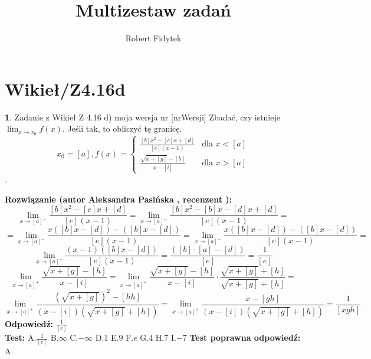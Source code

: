 \documentclass[12pt, a4paper]{article}
\title{Multizestaw zadań}
\author{Robert Fidytek}
\date{}
\theoremstyle{definition} %
\newtheorem{zad}{}
\newcommand{\kategoria}[1]{\section{#1}} %
\newcommand{\zadStart}[1]{\begin{zad}#1\newline} %
\newcommand{\zadStop}{\end{zad}}   %
\newcommand{\rozwStart}[2]{\noindent \textbf{Rozwiązanie (autor #1 , recenzent #2): }\newline} %
\newcommand{\rozwStop}{\newline}                                            %
\newcommand{\odpStart}{\noindent \textbf{Odpowiedź:}\newline}    %
\newcommand{\odpStop}{\newline}                                             %
\newcommand{\testStart}{\noindent \textbf{Test:}\newline} %
\newcommand{\testStop}{\newline} %
\newcommand{\kluczStart}{\noindent \textbf{Test poprawna odpowiedź:}\newline} %
\newcommand{\kluczStop}{\newline} %
\begin{document}
\maketitle


\kategoria{Wikieł/Z4.16d}
\zadStart{Zadanie z Wikieł Z 4.16 d) moja wersja nr [nrWersji]}
Zbadać, czy istnieje $\lim_{x\rightarrow x_{0}}f(x)$. Jeśli tak, to obliczyć tę granicę. $$x_{0}=[a],f(x)= \left\{ \begin{array}{ll}
\frac{[b]x^2-[c]x+[d]}{[e](x-1)}& \textrm{dla $x<[a]$}\\
\frac{\sqrt{x+[g]}-[h]}{x-[i]} & \textrm{dla $x>[a]$}
\end{array} \right.$$.
\zadStop
\rozwStart{Aleksandra Pasińska}{}
$$\lim_{x\rightarrow [a]^-}\frac{[b]x^2-[c]x+[d]}{[e](x-1)}=\lim_{x\rightarrow [a]^-}\frac{[b]x^2-[b]x-[d]x+[d]}{[e](x-1)}=$$
$$=\lim_{x\rightarrow [a]^-}\frac{x([b]x-[d])-([b]x-[d])}{[e](x-1)}=\lim_{x\rightarrow [a]^-}\frac{x([b]x-[d])-([b]x-[d])}{[e](x-1)}=$$
$$\lim_{x\rightarrow [a]^-}\frac{(x-1)([b]x-[d])}{[e](x-1)}=\frac{([b]\cdot [a]-[d])}{[e]}=\frac{1}{[e]}$$
$$\lim_{x\rightarrow [a]^+}\frac{\sqrt{x+[g]}-[h]}{x-[i]}=\lim_{x\rightarrow [a]^+}\frac{\sqrt{x+[g]}-[h]}{x-[i]}\cdot \frac{\sqrt{x+[g]}+[h]}{\sqrt{x+[g]}+[h]}=$$
$$\lim_{x\rightarrow [a]^+}\frac{(\sqrt{x+[g]})^2-[hh]}{(x-[i])(\sqrt{x+[g]}+[h])}=\lim_{x\rightarrow [a]^+}\frac{x-[gh]}{(x-[i])(\sqrt{x+[g]}+[h])}=\frac{1}{[xgh]}$$
\rozwStop
\odpStart
$\frac{1}{[e]}$\\
\odpStop
\testStart
A.$\frac{1}{[e]}$
B.$\infty$
C.$-\infty$
D.$1$
E.$9$
F.$e$
G.$4$
H.$7$
I.$-7$
\testStop
\kluczStart
A
\kluczStop
\end{document}
